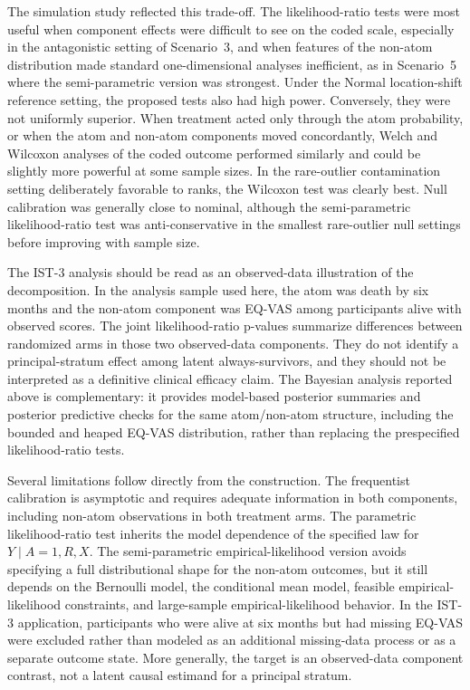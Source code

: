 \documentclass[11pt]{article}
\begin{document}
The simulation study reflected this trade-off. The likelihood-ratio tests were most useful when component effects were difficult to see on the coded scale, especially in the antagonistic setting of Scenario~3, and when features of the non-atom distribution made standard one-dimensional analyses inefficient, as in Scenario~5 where the semi-parametric version was strongest. Under the Normal location-shift reference setting, the proposed tests also had high power. Conversely, they were not uniformly superior. When treatment acted only through the atom probability, or when the atom and non-atom components moved concordantly, Welch and Wilcoxon analyses of the coded outcome performed similarly and could be slightly more powerful at some sample sizes. In the rare-outlier contamination setting deliberately favorable to ranks, the Wilcoxon test was clearly best. Null calibration was generally close to nominal, although the semi-parametric likelihood-ratio test was anti-conservative in the smallest rare-outlier null settings before improving with sample size.

The IST-3 analysis should be read as an observed-data illustration of the decomposition. In the analysis sample used here, the atom was death by six months and the non-atom component was EQ-VAS among participants alive with observed scores. The joint likelihood-ratio p-values summarize differences between randomized arms in those two observed-data components. They do not identify a principal-stratum effect among latent always-survivors, and they should not be interpreted as a definitive clinical efficacy claim. The Bayesian analysis reported above is complementary: it provides model-based posterior summaries and posterior predictive checks for the same atom/non-atom structure, including the bounded and heaped EQ-VAS distribution, rather than replacing the prespecified likelihood-ratio tests.

Several limitations follow directly from the construction. The frequentist calibration is asymptotic and requires adequate information in both components, including non-atom observations in both treatment arms. The parametric likelihood-ratio test inherits the model dependence of the specified law for $Y\mid A=1,R,X$. The semi-parametric empirical-likelihood version avoids specifying a full distributional shape for the non-atom outcomes, but it still depends on the Bernoulli model, the conditional mean model, feasible empirical-likelihood constraints, and large-sample empirical-likelihood behavior. In the IST-3 application, participants who were alive at six months but had missing EQ-VAS were excluded rather than modeled as an additional missing-data process or as a separate outcome state. More generally, the target is an observed-data component contrast, not a latent causal estimand for a principal stratum.
\end{document}

